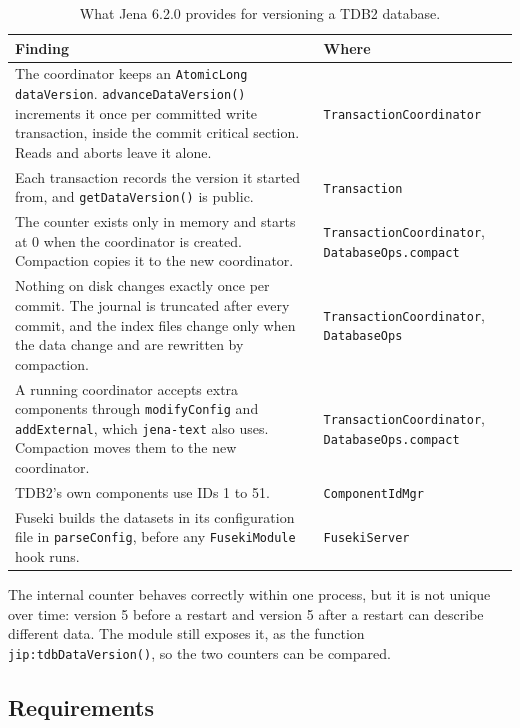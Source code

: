 \documentclass[11pt,a4paper]{article}
\newcommand{\code}[1]{\texttt{#1}}
\begin{document}
\begin{table}[ht]
\centering
\caption{What Jena 6.2.0 provides for versioning a TDB2 database.}
\label{tab:findings}
\small
\begin{tabularx}{\linewidth}{@{}>{\raggedright\arraybackslash}X>{\raggedright\arraybackslash}p{38mm}@{}}
\toprule
Finding & Where \\
\midrule
The coordinator keeps an \code{AtomicLong dataVersion}. \code{advanceDataVersion()} increments
it once per committed write transaction, inside the commit critical section. Reads and aborts
leave it alone. & \code{TransactionCoordinator} \\
Each transaction records the version it started from, and \code{getDataVersion()} is public.
& \code{Transaction} \\
The counter exists only in memory and starts at 0 when the coordinator is created. Compaction
copies it to the new coordinator. & \code{TransactionCoordinator}, \code{DatabaseOps.compact} \\
Nothing on disk changes exactly once per commit. The journal is truncated after every commit,
and the index files change only when the data change and are rewritten by compaction.
& \code{TransactionCoordinator}, \code{DatabaseOps} \\
A running coordinator accepts extra components through \code{modifyConfig} and
\code{addExternal}, which \code{jena-text} also uses. Compaction moves them to the new
coordinator. & \code{TransactionCoordinator}, \code{DatabaseOps.compact} \\
TDB2's own components use IDs 1 to 51. & \code{ComponentIdMgr} \\
Fuseki builds the datasets in its configuration file in \code{parseConfig}, before any
\code{FusekiModule} hook runs. & \code{FusekiServer} \\
\bottomrule
\end{tabularx}
\end{table}

The internal counter behaves correctly within one process, but it is not unique over time:
version 5 before a restart and version 5 after a restart can describe different data. The
module still exposes it, as the function \code{jip:tdbDataVersion()}, so the two counters can
be compared.

\subsection{Requirements}
\label{sec:requirements}
\end{document}
